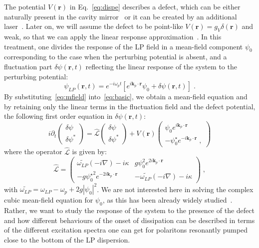 The potential $V(\bm{r})$ in Eq.~\eqref{eq:dispe} describes a
defect, which can be either naturally present in the cavity
mirror~\cite{Amo_2009} or it can be created by an additional
laser~\cite{Amo_2010}. Later on, we will assume the defect to be
point-like $V(\bm{r})=g_V \delta(\bm{r})$ and weak, so that we can
apply the linear response approximation~\cite{Astrakharchik_2004}.
%
In this treatment, one divides the response of the LP field in a
mean-field component $\psi_0$ corresponding to the case when the
perturbing potential is absent, and a fluctuation part $\delta \psi
(\bm{r},t)$ reflecting the linear response of the system to the
perturbing potential:
%
\begin{equation}
  \psi_{LP} (\bm{r},t) = e^{-i \omega_p t} \left[e^{i \bm{k}_p
      \cdot \bm{r}} \psi_0 + \delta \psi (\bm{r},t)\right] \; .
\label{eq:mfield}
\end{equation}
%
By substituting~\eqref{eq:mfield} into~\eqref{eq:basic}, we obtain a
mean-field equation and by retaining only the linear terms in the
fluctuation field and the defect potential, the following first order
equation in $\delta \psi (\bm{r},t)$:
%
\begin{equation}
  i \partial_t \begin{pmatrix} \delta \psi \\ \delta
    \psi^* \end{pmatrix} = \hat{\mathcal{L}} \begin{pmatrix} \delta
    \psi \\ \delta \psi^* \end{pmatrix} + V(\bm{r}) \begin{pmatrix}
    \psi_0 e^{i \bm{k}_p \cdot \bm{r}} \\ -\psi_0^{\star} e^{-i
      \bm{k}_p \cdot \bm{r}}\; ,
    \end{pmatrix}
\label{eq:linre}
\end{equation}
%
where the operator $\hat{\mathcal{L}}$ is given by:
%
\begin{equation}
 \hat{\mathcal{L}} = \begin{pmatrix} \widetilde{\omega_{LP}}
   (-i\nabla) - i \kappa & g \psi_0^2 e^{2 i \bm{k}_p \cdot
     \bm{r}} \\ -g {\psi_0^{\star}}^2 e^{-2 i \bm{k}_p \cdot
     \bm{r}}& - \widetilde{\omega_{LP}}(-i \nabla) -
   i\kappa \end{pmatrix}\; ,
\end{equation}
%
with $\widetilde{\omega_{LP}} = \omega_{LP}-\omega_p + 2g
|\psi_0|^2$. We are not interested here in solving the complex cubic
mean-field equation for $\psi_0$, as this has been already widely
studied~\cite{9780199228942}. Rather, we want to study the response
of the system to the presence of the defect and how different
behaviours of the onset of dissipation can be described in terms of
the different excitation spectra one can get for polaritons resonantly
pumped close to the bottom of the LP dispersion.

